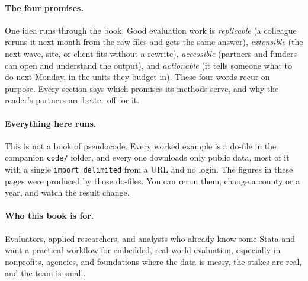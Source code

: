 \documentclass[
    a4paper,
    fontsize=10pt,
    twoside=true,
    numbers=noenddot,
]{kaobook}
\begin{document}
\paragraph{The four promises.} One idea runs through the book. Good evaluation work is \emph{replicable} (a colleague reruns it next month from the raw files and gets the same answer), \emph{extensible} (the next wave, site, or client fits without a rewrite), \emph{accessible} (partners and funders can open and understand the output), and \emph{actionable} (it tells someone what to do next Monday, in the units they budget in). These four words recur on purpose. Every section says which promises its methods serve, and why the reader's partners are better off for it.

\paragraph{Everything here runs.} This is not a book of pseudocode. Every worked example is a do-file in the companion \texttt{code/} folder, and every one downloads only public data, most of it with a single \texttt{import delimited} from a URL and no login. The figures in these pages were produced by those do-files. You can rerun them, change a county or a year, and watch the result change.

\paragraph{Who this book is for.} Evaluators, applied researchers, and analysts who already know some Stata and want a practical workflow for embedded, real-world evaluation, especially in nonprofits, agencies, and foundations where the data is messy, the stakes are real, and the team is small.
\end{document}
